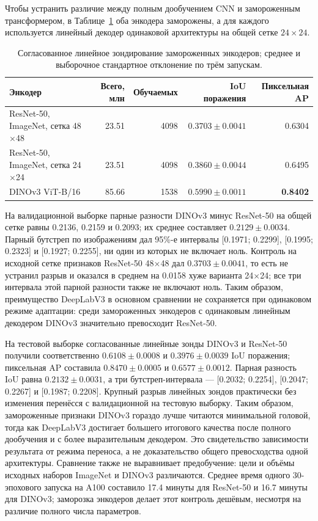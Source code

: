 \documentclass[a4paper,12pt]{extarticle}
\begin{document}
Чтобы устранить различие между полным дообучением CNN и замороженным
трансформером, в Таблице~\ref{tab:linear-probes} оба энкодера заморожены, а для
каждого используется линейный декодер одинаковой архитектуры на общей сетке
$24\times24$.

\begin{table}[ht]
  \caption{Согласованное линейное зондирование замороженных энкодеров;
  среднее и выборочное стандартное отклонение по трём запускам.}
  \label{tab:linear-probes}
  \centering
  \footnotesize
  \begin{tabular}{lrrrr}
    \toprule
    Энкодер & Всего, млн & Обучаемых & IoU поражения & Пиксельная AP \\
    \midrule
    ResNet-50, ImageNet, сетка 48$\times$48 & 23.51 & 4098 & $0.3703\pm0.0041$ & 0.6304 \\
    ResNet-50, ImageNet, сетка 24$\times$24 & 23.51 & 4098 & $0.3860\pm0.0044$ & 0.6495 \\
    DINOv3 ViT-B/16 & 85.66 & 1538 & $\mathbf{0.5990\pm0.0011}$ & \textbf{0.8402} \\
    \bottomrule
  \end{tabular}
\end{table}

На валидационной выборке парные разности DINOv3 минус ResNet-50 на общей сетке равны
0.2136, 0.2159 и
0.2093; их среднее составляет $0.2129\pm0.0034$. Парный бутстреп по изображениям
дал 95\%-е интервалы [0.1971; 0.2299], [0.1995; 0.2323] и
[0.1927; 0.2255], ни один из которых не включает ноль. Контроль на исходной
сетке признаков ResNet-50 48$\times$48 дал $0.3703\pm0.0041$, то есть не
устранил разрыв и оказался в среднем на 0.0158 хуже варианта 24$\times$24;
все три интервала этой парной разности также не включают ноль. Таким образом,
преимущество DeepLabV3 в основном сравнении не сохраняется при одинаковом режиме
адаптации: среди замороженных энкодеров с одинаковым линейным декодером DINOv3
значительно превосходит ResNet-50.

На тестовой выборке согласованные линейные зонды DINOv3 и ResNet-50 получили соответственно
$0.6108\pm0.0008$ и $0.3976\pm0.0039$ IoU поражения; пиксельная AP составила
$0.8470\pm0.0005$ и $0.6577\pm0.0012$. Парная разность IoU равна
$0.2132\pm0.0031$, а три бутстреп-интервала --- [0.2032; 0.2254],
[0.2047; 0.2267] и [0.1987; 0.2208]. Крупный разрыв линейных зондов практически
без изменения перенёсся с валидационной на тестовую выборку. Таким образом, замороженные
признаки DINOv3 гораздо лучше читаются минимальной головой, тогда как
DeepLabV3 достигает большего итогового качества после полного дообучения и с
более выразительным декодером. Это свидетельство зависимости результата от
режима переноса, а не доказательство общего превосходства одной архитектуры.
Сравнение также не выравнивает предобучение: цели и объёмы исходных наборов
ImageNet и DINOv3 различаются.
Среднее время одного 30-эпохового запуска на A100 составило 17.4 минуты для
ResNet-50 и 16.7 минуты для DINOv3; заморозка энкодеров делает этот контроль
дешёвым, несмотря на различие полного числа параметров.
\end{document}
